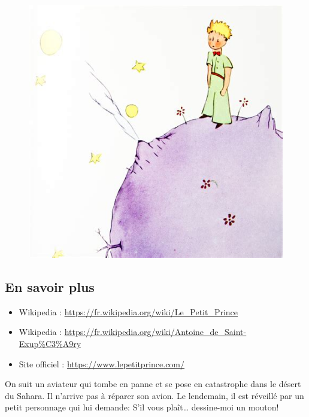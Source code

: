\begin{multicols}{2}

  \begin{figure}[H]
    \centering
    \includegraphics[width=0.8\linewidth]{4x5-calcul-litteral/pp.png}
  \end{figure}

\subsection*{En savoir plus}

\begin{itemize}
\item Wikipedia : \url{https://fr.wikipedia.org/wiki/Le_Petit_Prince}
\item Wikipedia : \url{https://fr.wikipedia.org/wiki/Antoine_de_Saint-Exup%C3%A9ry}
\item Site officiel : \url{https://www.lepetitprince.com/}
\end{itemize}


On suit un aviateur qui tombe en panne et se pose en catastrophe dans le désert du Sahara. Il n’arrive pas à réparer son avion. Le lendemain, il est réveillé par un petit personnage qui lui demande: \og S'il vous plaît… dessine-moi un mouton! \fg 

\end{multicols}

\horrule{1px}

